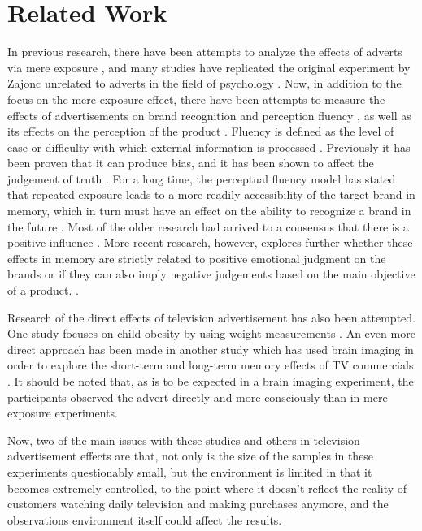 \documentclass[review]{elsarticle}
\begin{document}
\section{Related Work}
\label{related}

In previous research, there have been attempts to analyze the effects of adverts via mere exposure \cite{11}, and many studies have replicated the original experiment by Zajonc unrelated to adverts in the field of psychology \cite{12,13}. Now, in addition to the focus on the mere exposure effect, there have been attempts to measure the effects of advertisements on brand recognition and perception fluency \cite{14}, as well as its effects on the perception of the product \cite{15}. Fluency is defined as the level of ease or difficulty with which external information is processed \cite{16}. Previously it has been proven that it can produce bias, and it has been shown to affect the judgement of truth \cite{17}. For a long time, the perceptual fluency model has stated that repeated exposure leads to a more readily accessibility of the target brand in memory, which in turn must have an effect on the ability to recognize a brand in the future \cite[e.g.][]{18}. Most of the older research had arrived to a consensus that there is a positive influence \cite{19, 20}. More recent research, however, explores further whether these effects in memory are strictly related to positive emotional judgment on the brands or if they can also imply negative judgements based on the main objective of a product. \cite{21}. 

Research of the direct effects of television advertisement has also been attempted. One study focuses on child obesity by using weight measurements \cite{22}. An even more direct approach has been made in another study which has used brain imaging in order to explore the short-term and long-term memory effects of TV commercials \cite{23}. It should be noted that, as is to be expected in a brain imaging experiment, the participants observed the advert directly and more consciously than in mere exposure experiments. 

Now, two of the main issues with these studies and others in television advertisement effects are that, not only is the size of the samples in these experiments questionably small, but the environment is limited in that it becomes extremely controlled, to the point where it doesn't reflect the reality of customers watching daily television and making purchases anymore, and the observations environment itself could affect the results. 
\end{document}
